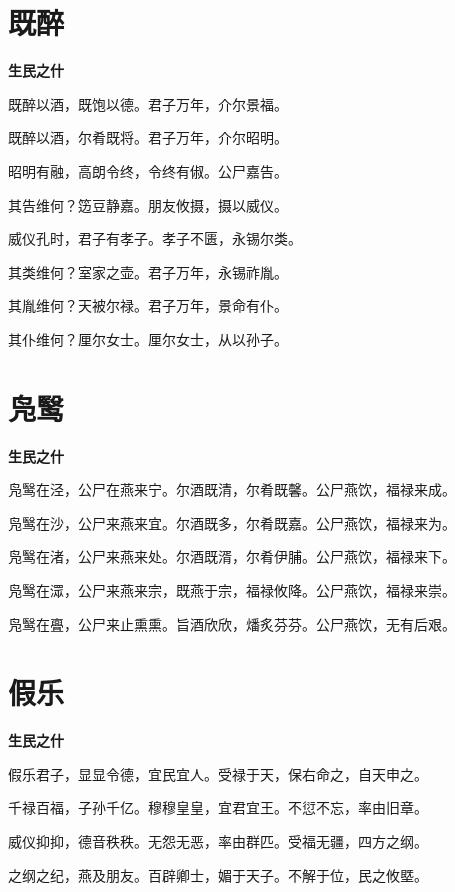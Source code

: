 \documentclass[12pt,a4paper]{ctexbook}
\begin{document}
\section{既醉}
\textbf{生民之什}\par\vspace{0.5em}
既醉以酒，既饱以德。君子万年，介尔景福。\par
既醉以酒，尔肴既将。君子万年，介尔昭明。\par
昭明有融，高朗令终，令终有俶。公尸嘉告。\par
其告维何？笾豆静嘉。朋友攸摄，摄以威仪。\par
威仪孔时，君子有孝子。孝子不匮，永锡尔类。\par
其类维何？室家之壶。君子万年，永锡祚胤。\par
其胤维何？天被尔禄。君子万年，景命有仆。\par
其仆维何？厘尔女士。厘尔女士，从以孙子。\par

\section{凫鹥}
\textbf{生民之什}\par\vspace{0.5em}
凫鹥在泾，公尸在燕来宁。尔酒既清，尔肴既馨。公尸燕饮，福禄来成。\par
凫鹥在沙，公尸来燕来宜。尔酒既多，尔肴既嘉。公尸燕饮，福禄来为。\par
凫鹥在渚，公尸来燕来处。尔酒既湑，尔肴伊脯。公尸燕饮，福禄来下。\par
凫鹥在潀，公尸来燕来宗，既燕于宗，福禄攸降。公尸燕饮，福禄来崇。\par
凫鹥在亹，公尸来止熏熏。旨酒欣欣，燔炙芬芬。公尸燕饮，无有后艰。\par

\section{假乐}
\textbf{生民之什}\par\vspace{0.5em}
假乐君子，显显令德，宜民宜人。受禄于天，保右命之，自天申之。\par
千禄百福，子孙千亿。穆穆皇皇，宜君宜王。不愆不忘，率由旧章。\par
威仪抑抑，德音秩秩。无怨无恶，率由群匹。受福无疆，四方之纲。\par
之纲之纪，燕及朋友。百辟卿士，媚于天子。不解于位，民之攸塈。\par
\end{document}
